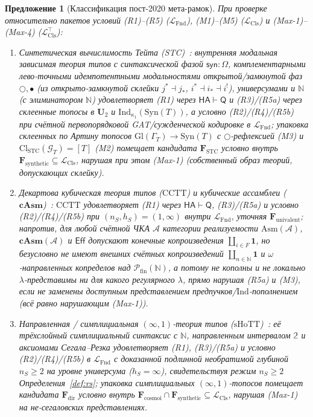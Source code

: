 \documentclass[11pt]{article}
\theoremstyle{plain}
\newtheorem{proposition}[theorem]{Предложение}
\theoremstyle{definition}
\newcommand{\LFnd}{\mathcal{L}_{\mathrm{Fnd}}}
\newcommand{\LCls}{\mathcal{L}_{\mathrm{Cls}}}
\newcommand{\LClsMax}{\mathcal{L}_{\mathrm{Cls}}^{\top}}
\newcommand{\Cl}{\mathrm{Cl}}
\newcommand{\Syn}{\mathrm{Syn}}
\newcommand{\Eff}{\ensuremath{\mathsf{Eff}}}
\begin{document}
\begin{proposition}[Классификация пост-2020 мета-рамок]\label{prop:q2-candidates}
При проверке относительно пакетов условий (R1)--(R5) ($\LFnd$), (M1)--(M5) ($\LCls$) и (Max-1)--(Max-4) ($\LClsMax$):
\begin{enumerate}[nosep,label=(\roman*)]
\item \emph{Синтетическая вычислимость Тейта (STC)}~\cite{Sterling2021}: внутренняя модальная зависимая теория типов с синтаксической фазой $\mathsf{syn}:\Omega$, комплементарными лево-точными идемпотентными модальностями открытой/замкнутой фаз $\bigcirc, \bullet$ (из открыто-замкнутой склейки $j^* \dashv j_*$, $i^* \dashv i_* \dashv i^!$), универсумами и $\mathbb{N}$ (с элиминатором $\mathbb{N}$) удовлетворяет (R1) через $\mathsf{HA} \vdash \mathsf{Q}$ и (R3)/(R5a) через склеенные топосы в $\mathbf{U}_2$ и $\mathrm{Ind}_{\kappa_1}(\Syn(T))$, а условно (R2)/(R4)/(R5b) при счётной первопорядковой GAT/сужденческой кодировке в $\LFnd$; упаковка склеенных по Артину топосов $\mathrm{Gl}(\Gamma_T)\to\Syn(T)$ с $\bigcirc$-рефлексией (M3) и $\Cl_{\mathrm{STC}}(\mathcal{G}_T)=[T]$ (M2) помещает кандидата $\mathbf{F}_{\mathrm{STC}}$ условно внутрь $\mathbf{F}_{\mathrm{synthetic}}\subseteq\LCls$, нарушая при этом (Max-1) (собственный образ теорий, допускающих склейку).
\item \emph{Декартова кубическая теория типов ($\mathrm{CCTT}$) и кубические ассамблеи ($\mathbf{cAsm}$)}~\cite{AngiuliEtAl2021,Swan2018}: $\mathrm{CCTT}$ удовлетворяет (R1) через $\mathsf{HA} \vdash \mathsf{Q}$, (R3)/(R5a) и условно (R2)/(R4)/(R5b) при $(n_S, h_S) = (1, \infty)$ внутри $\LFnd$, уточняя $\mathbf{F}_{\mathrm{univalent}}$; напротив, для любой счётной ЧКА $\mathcal{A}$ категории реализуемости $\mathrm{Asm}(\mathcal{A})$, $\mathbf{cAsm}(\mathcal{A})$ и $\Eff$ допускают конечные копроизведения $\coprod_{i \in F}\mathbf{1}$, но безусловно не имеют внешних счётных копроизведений $\coprod_{n \in \mathbb{N}}\mathbf{1}$ и $\omega$-направленных копределов над $\mathcal{P}_{\mathrm{fin}}(\mathbb{N})$, а потому не кополны и не локально $\lambda$-представимы ни для какого регулярного $\lambda$, прямо нарушая (R5a) и (M3), если не заменены доступным представлением предпучков/$\mathrm{Ind}$-пополнением (всё равно нарушающим (Max-1)).
\item \emph{Направленная / симплициальная $(\infty, 1)$-теория типов ($\mathrm{sHoTT}$)}~\cite{RiehlShulman2017}: её трёхслойный симплициальный синтаксис с $\mathbb{N}$, направленным интервалом $\mathbb{2}$ и аксиомами Сегала--Резка удовлетворяет (R1), (R3)/(R5a) и условно (R2)/(R4)/(R5b) в $\LFnd$ с доказанной подлинной необратимой глубиной $n_S \ge 2$ на уровне универсума ($h_S = \infty$), свидетельствуя режим $n_S \ge 2$ Определения~\ref{def:rs}; упаковка симплициальных $(\infty,1)$-топосов помещает кандидата $\mathbf{F}_{\mathrm{dir}}$ условно внутрь $\mathbf{F}_{\mathrm{cosmoi}} \cap \mathbf{F}_{\mathrm{synthetic}} \subseteq \LCls$, нарушая (Max-1) на не-сегаловских представлениях.
\end{enumerate}
\end{proposition}
\end{document}
